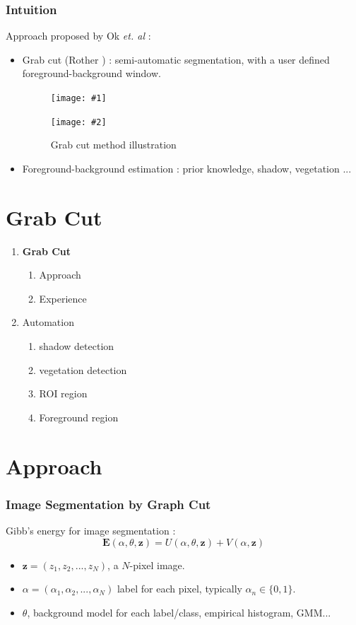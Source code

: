 \documentclass[compress]{beamer} %
\newcommand{\insertTwoF}[4]{
  \begin{figure}[h!]
    \centering
    \begin{minipage}{#4\linewidth}
    \texttt{[image: \#1]}
    \end{minipage}
    \begin{minipage}{#4\linewidth}
    \texttt{[image: \#2]}
    \end{minipage}
      \caption{#3}
  \end{figure}  
}
\newcommand{\bfE}{\mathbf{E}}
\newcommand{\bfz}{\mathbf{z}}
\begin{document}
 \begin{frame}
  \frametitle{Intuition}
  Approach proposed by Ok {\textit{et. al}} \cite{Ok:2013} : 
  \begin{itemize}
   \item Grab cut (Rother \cite{Rother:2004}) : semi-automatic segmentation, with a user defined foreground-background window.
   \insertTwoF{grab_cut}{grab_cut_result}{Grab cut method illustration}{0.45}
   \item Foreground-background estimation : prior knowledge, shadow, vegetation ...
  \end{itemize}
 \end{frame}

 \section{Grab Cut}
 \begin{frame}
  \scriptsize
  {
  \begin{enumerate}
  \item \textbf{Grab Cut} 
    \begin{enumerate}
     \item Approach
     \item Experience
    \end{enumerate}
  \item Automation
    \begin{enumerate}
     \item shadow detection
     \item vegetation detection
     \item ROI region
     \item Foreground region
    \end{enumerate}
  \end{enumerate}
  }
 \end{frame}  
 
 \section{Approach}
 \begin{frame}
  \frametitle{Image Segmentation by Graph Cut}
  Gibb's energy for image segmentation :
  \[
  \bfE(\alpha,\theta,\bfz)=U(\alpha,\theta,\bfz)+V(\alpha,\bfz)
  \]
  \begin{itemize}
   \item<1> $\bfz=(z_1,z_2,...,z_N)$, a $N$-pixel image.
   \item<1> $\alpha=(\alpha_1,\alpha_2,...,\alpha_N)$ label for each pixel, typically $\alpha_n\in\{0,1\}$.
   \item<1> $\theta$, background model for each label/class, empirical histogram, GMM...
  \end{itemize}
 \end{frame}
\end{document}
